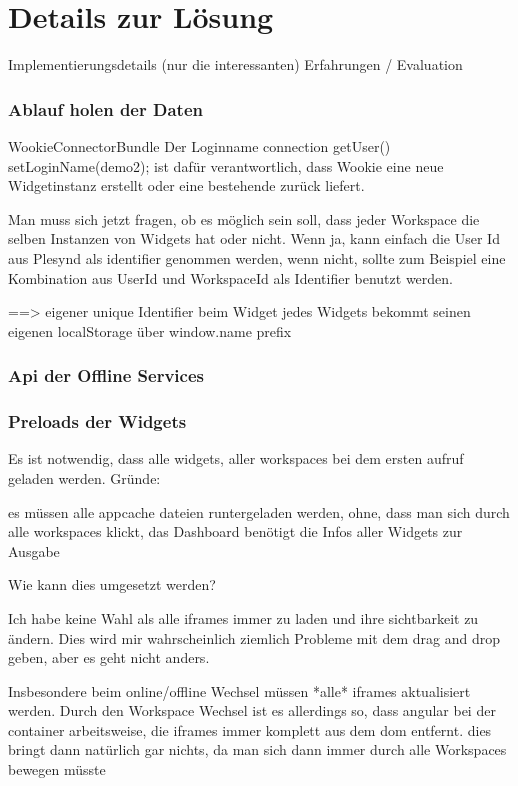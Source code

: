 \chapter{Details zur Lösung} 
\label{Kapitel 6}
Implementierungsdetails (nur die interessanten)
Erfahrungen / Evaluation

\subsection{Ablauf holen der Daten}
WookieConnectorBundle
Der Loginname  connection getUser() setLoginName(demo2); ist dafür verantwortlich, dass Wookie eine neue Widgetinstanz erstellt oder eine bestehende zurück liefert.

Man muss sich jetzt fragen, ob es möglich sein soll, dass jeder Workspace die selben Instanzen von Widgets hat oder nicht.
Wenn ja, kann einfach die User Id aus Plesynd als identifier genommen werden, wenn nicht, sollte zum Beispiel eine Kombination aus UserId und WorkspaceId als Identifier benutzt werden.

==> eigener unique Identifier beim Widget
jedes Widgets bekommt seinen eigenen localStorage über window.name prefix

\subsection{Api der Offline Services}


\subsection{Preloads der Widgets}
Es ist notwendig, dass alle widgets, aller workspaces bei dem ersten aufruf geladen werden.
Gründe:

    es müssen alle appcache dateien runtergeladen werden, ohne, dass man sich durch alle workspaces klickt,
    das Dashboard benötigt die Infos aller Widgets zur Ausgabe

Wie kann dies umgesetzt werden?


Ich habe keine Wahl als alle iframes immer zu laden und ihre sichtbarkeit zu ändern. Dies wird mir wahrscheinlich ziemlich Probleme mit dem drag and drop geben, aber es geht nicht anders.

 

Insbesondere beim online/offline Wechsel müssen *alle* iframes aktualisiert werden. Durch den Workspace Wechsel ist es allerdings so, dass angular bei der container arbeitsweise, die iframes immer komplett aus dem dom entfernt. dies bringt dann natürlich gar nichts, da man sich dann immer durch alle Workspaces bewegen müsste



